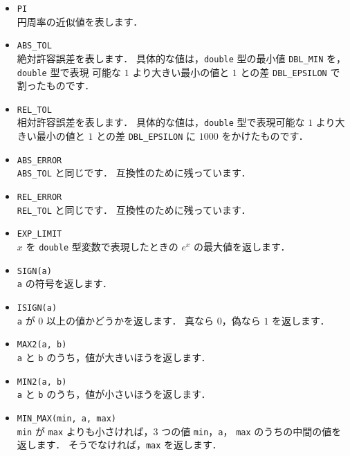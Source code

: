 \begin{itemize}
\item \verb|PI| \ \\
円周率の近似値を表します．

\item \verb|ABS_TOL| \ \\
絶対許容誤差を表します．
具体的な値は，\verb|double| 型の最小値 \verb|DBL_MIN| を，\verb|double| 型で表現
可能な $1$ より大きい最小の値と $1$ との差 \verb|DBL_EPSILON| で割ったものです．

\item \verb|REL_TOL| \ \\
相対許容誤差を表します．
具体的な値は，\verb|double| 型で表現可能な $1$ より大きい最小の値と $1$ との差 
\verb|DBL_EPSILON| に $1000$ をかけたものです．

\item \verb|ABS_ERROR| \ \\
\verb|ABS_TOL| と同じです．
互換性のために残っています．

\item \verb|REL_ERROR| \ \\
\verb|REL_TOL| と同じです．
互換性のために残っています．

\item \verb|EXP_LIMIT| \ \\
$x$ を \verb|double| 型変数で表現したときの $e^x$ の最大値を返します．

\item \verb|SIGN(a)| \ \\
\verb|a| の符号を返します．

\item \verb|ISIGN(a)| \ \\
\verb|a| が $0$ 以上の値かどうかを返します．
真なら $0$，偽なら $1$ を返します．

\item \verb|MAX2(a, b)| \ \\
\verb|a| と \verb|b| のうち，値が大きいほうを返します．

\item \verb|MIN2(a, b)| \ \\
\verb|a| と \verb|b| のうち，値が小さいほうを返します．

\item \verb|MIN_MAX(min, a, max)| \ \\
\verb|min| が \verb|max| よりも小さければ，$3$ つの値 \verb|min|，\verb|a|，
\verb|max| のうちの中間の値を返します．
そうでなければ，\verb|max| を返します．


\end{itemize}

